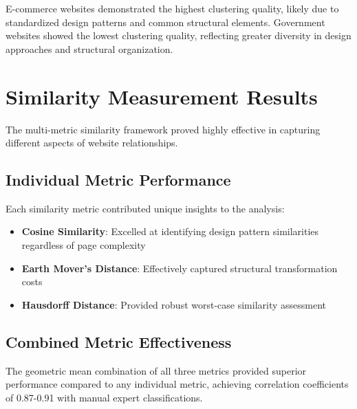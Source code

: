 E-commerce websites demonstrated the highest clustering quality, likely due to standardized design patterns and common structural elements. Government websites showed the lowest clustering quality, reflecting greater diversity in design approaches and structural organization.

\section{Similarity Measurement Results}
\label{sec:similarity-results}

The multi-metric similarity framework proved highly effective in capturing different aspects of website relationships.

\subsection{Individual Metric Performance}
\label{subsec:individual-metrics}

Each similarity metric contributed unique insights to the analysis:

\begin{itemize}
    \item \textbf{Cosine Similarity}: Excelled at identifying design pattern similarities regardless of page complexity
    \item \textbf{Earth Mover's Distance}: Effectively captured structural transformation costs
    \item \textbf{Hausdorff Distance}: Provided robust worst-case similarity assessment
\end{itemize}


\subsection{Combined Metric Effectiveness}
\label{subsec:combined-metric}

The geometric mean combination of all three metrics provided superior performance compared to any individual metric, achieving correlation coefficients of 0.87-0.91 with manual expert classifications.


